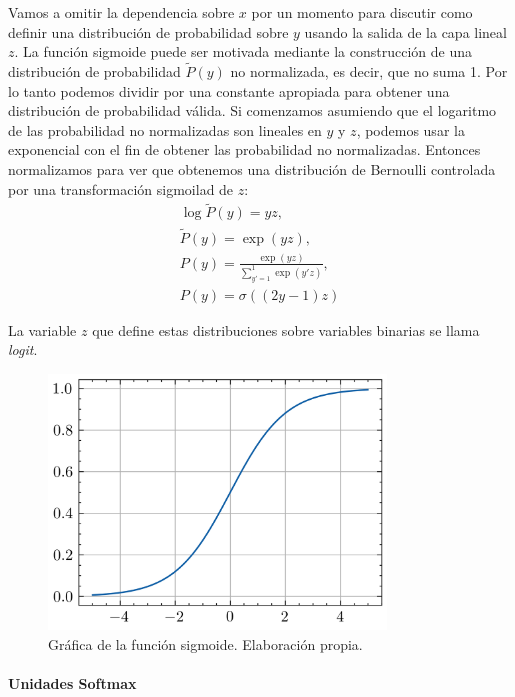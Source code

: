 Vamos a omitir la dependencia sobre $x$ por un momento para discutir como definir una distribución de probabilidad sobre $y$ usando la salida de la capa lineal $z$. La función sigmoide puede ser motivada mediante la construcción de una distribución de probabilidad $\tilde{P}(y)$ no normalizada, es decir, que no suma 1. Por lo tanto podemos dividir por una constante apropiada para obtener una distribución de probabilidad válida. Si comenzamos asumiendo que el logaritmo de las probabilidad no normalizadas son lineales en $y$ y $z$, podemos usar la exponencial con el fin de obtener las probabilidad no normalizadas. Entonces normalizamos para ver que obtenemos una distribución de Bernoulli controlada por una transformación sigmoilad de $z$:
\begin{gather}
    \log \tilde{P}(y) = yz, \\
    \tilde{P}(y) = \exp{(yz)}, \\
    P(y)=\frac{\exp{(yz)}}{\sum_{y'=1}^1 \exp{(y'z)}}, \\
    P(y) = \sigma((2y - 1)z)
\end{gather}

La variable $z$ que define estas distribuciones sobre variables binarias se llama \textit{logit}.

\begin{figure}[h]
    \centering
    \includegraphics[width=0.8\textwidth]{figuras/sigmoid.png}
    \caption{Gráfica de la función sigmoide. Elaboración propia.}
    \label{fig:sigmoid}
\end{figure}


\paragraph{Unidades Softmax}\mbox{}\\

